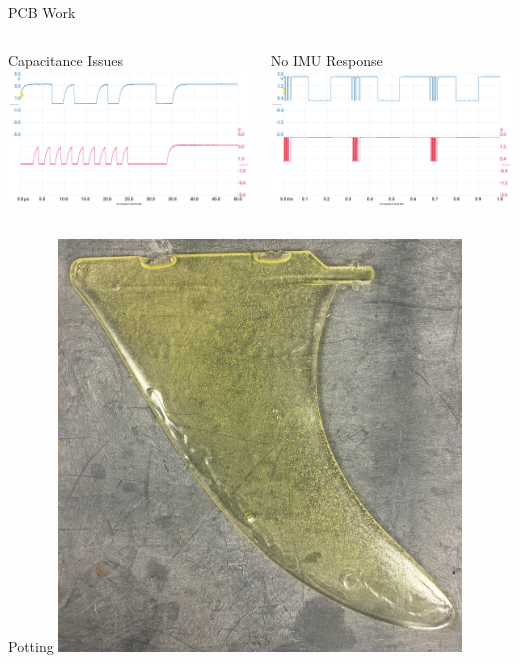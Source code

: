 \begin{frame}{PCB Work}
    \begin{columns}
        \begin{column}{0.5\textwidth}
            Capacitance Issues
            \includegraphics[height=1\textheight,width=1\textwidth,keepaspectratio]{images/PreResistorChange_Both.png}
        \end{column}
        \begin{column}{0.5\textwidth}
            No IMU Response
            \includegraphics[height=1\textheight,width=1\textwidth,keepaspectratio]{images/IMU_SDA_SCL_NoData.png}
        \end{column}
    \end{columns}
\end{frame}

\begin{frame}{Potting}
    \centering
    \includegraphics[height=0.8\textheight,width=0.8\textwidth,keepaspectratio]{images/Epoxy_fin.png}
\end{frame}
